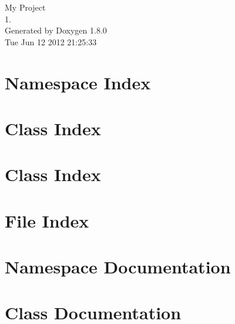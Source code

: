 \documentclass{book}
\begin{document}
\hypersetup{pageanchor=false,citecolor=blue}
\begin{titlepage}
\vspace*{7cm}
\begin{center}
{\Large My Project \\[1ex]\large 1. }\\
\vspace*{1cm}
{\large Generated by Doxygen 1.8.0}\\
\vspace*{0.5cm}
{\small Tue Jun 12 2012 21:25:33}\\
\end{center}
\end{titlepage}
\clearemptydoublepage
{}
\tableofcontents
\clearemptydoublepage
{}
\hypersetup{pageanchor=true,citecolor=blue}
\chapter{Namespace Index}

\chapter{Class Index}

\chapter{Class Index}

\chapter{File Index}

\chapter{Namespace Documentation}

\chapter{Class Documentation}






















\end{document}
